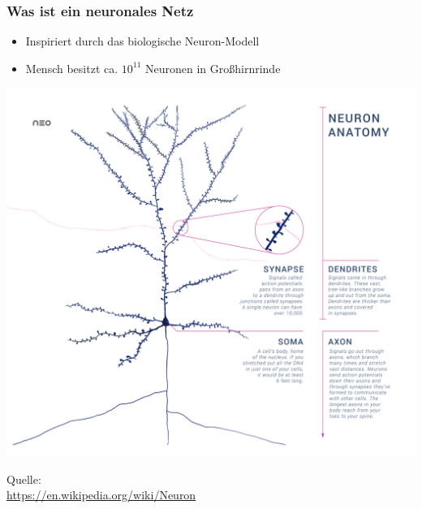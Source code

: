 %
\begin{frame}
  \frametitle{Was ist ein neuronales Netz}
  \begin{minipage}{0.5\textwidth}
  \begin{itemize}
    \item Inspiriert durch das biologische Neuron-Modell
    \item Mensch besitzt ca. $10^{11}$ Neuronen in Großhirnrinde
  \end{itemize}
  \end{minipage}%
  \hfill%
  \begin{minipage}{0.5\textwidth}
    \includegraphics[width=\textwidth]{Plots/anatomy-neuron.png}
  \end{minipage}
  \begin{minipage}{\textwidth}
   \begin{tiny}
      Quelle: \\
      \url{https://en.wikipedia.org/wiki/Neuron}%
   \end{tiny}
  \end{minipage}
\end{frame}

